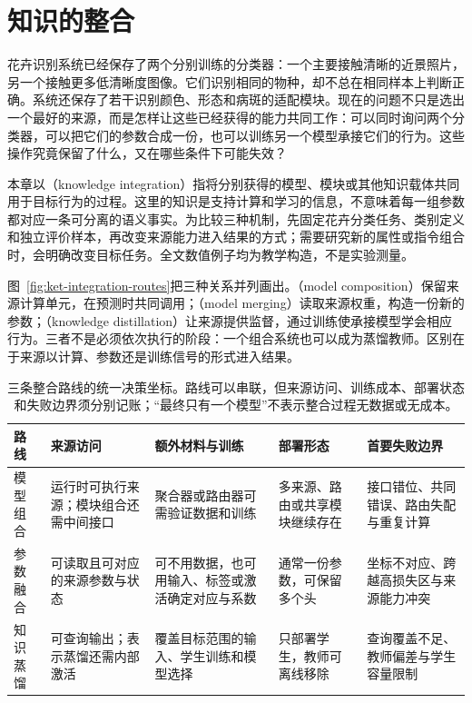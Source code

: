 \chapter{知识的整合}
\label{chap:ket-integration}

花卉识别系统已经保存了两个分别训练的分类器：一个主要接触清晰的近景照片，另一个接触更多低清晰度图像。它们识别相同的物种，却不总在相同样本上判断正确。系统还保存了若干识别颜色、形态和病斑的适配模块。现在的问题不只是选出一个最好的来源，而是怎样让这些已经获得的能力共同工作：可以同时询问两个分类器，可以把它们的参数合成一份，也可以训练另一个模型承接它们的行为。这些操作究竟保留了什么，又在哪些条件下可能失效？

本章以（knowledge integration）指将分别获得的模型、模块或其他知识载体共同用于目标行为的过程。这里的知识是支持计算和学习的信息，不意味着每一组参数都对应一条可分离的语义事实。为比较三种机制，先固定花卉分类任务、类别定义和独立评价样本，再改变来源能力进入结果的方式；需要研究新的属性或指令组合时，会明确改变目标任务。全文数值例子均为教学构造，不是实验测量。

图~\ref{fig:ket-integration-routes}把三种关系并列画出。（model composition）保留来源计算单元，在预测时共同调用；（model merging）读取来源权重，构造一份新的参数；（knowledge distillation）让来源提供监督，通过训练使承接模型学会相应行为。三者不是必须依次执行的阶段：一个组合系统也可以成为蒸馏教师。区别在于来源以计算、参数还是训练信号的形式进入结果。

\begin{table}[htbp]
  \centering
  \small
  \begin{tabularx}{\linewidth}{@{}p{22mm}XXXX@{}}
    \toprule
    路线 & 来源访问 & 额外材料与训练 & 部署形态 & 首要失败边界 \\
    \midrule
    模型组合 & 运行时可执行来源；模块组合还需中间接口 & 聚合器或路由器可需验证数据和训练 & 多来源、路由或共享模块继续存在 & 接口错位、共同错误、路由失配与重复计算 \\
    参数融合 & 可读取且可对应的来源参数与状态 & 可不用数据，也可用输入、标签或激活确定对应与系数 & 通常一份参数，可保留多个头 & 坐标不对应、跨越高损失区与来源能力冲突 \\
    知识蒸馏 & 可查询输出；表示蒸馏还需内部激活 & 覆盖目标范围的输入、学生训练和模型选择 & 只部署学生，教师可离线移除 & 查询覆盖不足、教师偏差与学生容量限制 \\
    \bottomrule
  \end{tabularx}
  \caption{三条整合路线的统一决策坐标。路线可以串联，但来源访问、训练成本、部署状态和失败边界须分别记账；“最终只有一个模型”不表示整合过程无数据或无成本。}
  \label{tab:ket-integration-route-choice}
\end{table}

